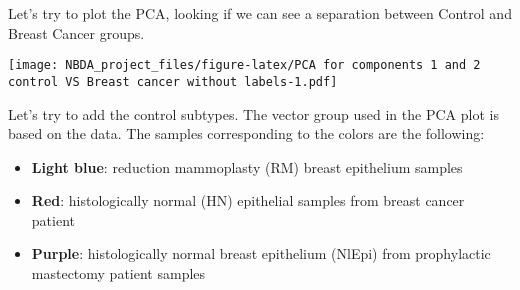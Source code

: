 \documentclass[
]{article}
\newenvironment{Shaded}{\begin{snugshade}}{\end{snugshade}}
\newcommand{\AttributeTok}[1]{\textcolor[rgb]{0.13,0.29,0.53}{#1}}
\newcommand{\CommentTok}[1]{\textcolor[rgb]{0.56,0.35,0.01}{\textit{#1}}}
\newcommand{\DecValTok}[1]{\textcolor[rgb]{0.00,0.00,0.81}{#1}}
\newcommand{\FloatTok}[1]{\textcolor[rgb]{0.00,0.00,0.81}{#1}}
\newcommand{\FunctionTok}[1]{\textcolor[rgb]{0.13,0.29,0.53}{\textbf{#1}}}
\newcommand{\NormalTok}[1]{#1}
\newcommand{\OtherTok}[1]{\textcolor[rgb]{0.56,0.35,0.01}{#1}}
\newcommand{\SpecialCharTok}[1]{\textcolor[rgb]{0.81,0.36,0.00}{\textbf{#1}}}
\newcommand{\StringTok}[1]{\textcolor[rgb]{0.31,0.60,0.02}{#1}}
\begin{document}
Let's try to plot the PCA, looking if we can see a separation between
Control and Breast Cancer groups.

\begin{Shaded}
\end{Shaded}

\texttt{[image: NBDA\_project\_files/figure-latex/PCA for components 1 and 2 control VS Breast cancer without labels-1.pdf]}

Let's try to add the control subtypes. The vector group used in the PCA
plot is based on the data. The samples corresponding to the colors are
the following:

\begin{itemize}
\item
  \textbf{Light blue}: reduction mammoplasty (RM) breast epithelium
  samples
\item
  \textbf{Red}: histologically normal (HN) epithelial samples from
  breast cancer patient
\item
  \textbf{Purple}: histologically normal breast epithelium (NlEpi) from
  prophylactic mastectomy patient samples
\end{itemize}
\end{document}
